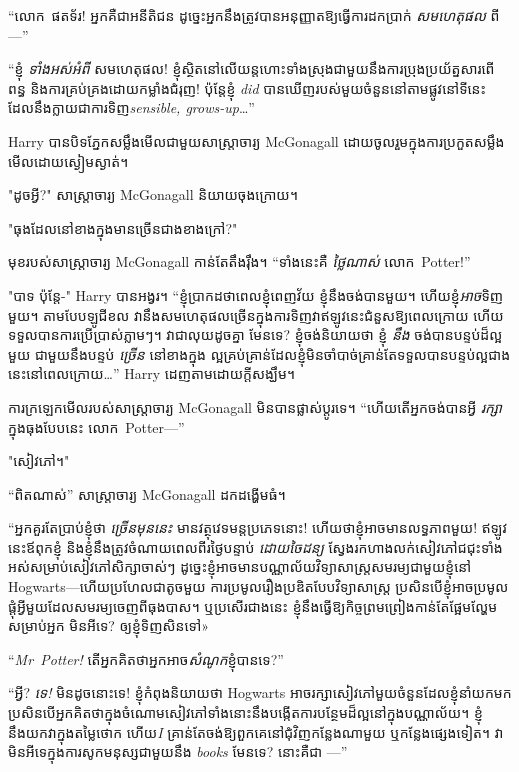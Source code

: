 “លោក~ផតទ័រ! អ្នកគឺជាអនីតិជន ដូច្នេះអ្នកនឹងត្រូវបានអនុញ្ញាតឱ្យធ្វើការដកប្រាក់ \emph{សមហេតុផល} ពី—”

“ខ្ញុំ \emph{ទាំងអស់អំពី} សមហេតុផល! ខ្ញុំ​ស្ថិត​នៅ​លើ​យន្តហោះ​ទាំង​ស្រុង​ជាមួយ​នឹង​ការ​ប្រុង​ប្រយ័ត្ន​សារពើពន្ធ និង​ការ​គ្រប់​គ្រង​ដោយ​កម្លាំង​ជំរុញ! ប៉ុន្តែខ្ញុំ \emph{did} បានឃើញរបស់មួយចំនួននៅតាមផ្លូវនៅទីនេះ ដែលនឹងក្លាយជាការទិញ\emph{sensible, grows-up}…”

Harry បានបិទភ្នែកសម្លឹងមើលជាមួយសាស្រ្តាចារ្យ McGonagall ដោយចូលរួមក្នុងការប្រកួតសម្លឹងមើលដោយស្ងៀមស្ងាត់។

"ដូចអ្វី?" សាស្ត្រាចារ្យ McGonagall និយាយចុងក្រោយ។

"ធុងដែលនៅខាងក្នុងមានច្រើនជាងខាងក្រៅ?"

មុខរបស់សាស្រ្តាចារ្យ McGonagall កាន់តែតឹងរ៉ឹង។ “ទាំងនេះគឺ \emph{ ថ្លៃណាស់} លោក~Potter!”

"បាទ ប៉ុន្តែ-" Harry បានអង្វរ។ “ខ្ញុំ​ប្រាកដ​ថា​ពេល​ខ្ញុំ​ពេញ​វ័យ ខ្ញុំ​នឹង​ចង់​បាន​មួយ។ ហើយខ្ញុំ\emph{អាច}ទិញមួយ។ តាមបែបឡូជីខល វានឹងសមហេតុផលច្រើនក្នុងការទិញវាឥឡូវនេះជំនួសឱ្យពេលក្រោយ ហើយទទួលបានការប្រើប្រាស់ភ្លាមៗ។ វាជាលុយដូចគ្នា មែនទេ? ខ្ញុំចង់និយាយថា ខ្ញុំ \emph{នឹង} ចង់បានបន្ទប់ដ៏ល្អមួយ ជាមួយនឹងបន្ទប់ \emph{ច្រើន} នៅខាងក្នុង ល្អគ្រប់គ្រាន់ដែលខ្ញុំមិនចាំបាច់គ្រាន់តែទទួលបានបន្ទប់ល្អជាងនេះនៅពេលក្រោយ…” Harry ដេញតាមដោយក្តីសង្ឃឹម។

ការក្រឡេកមើលរបស់សាស្រ្តាចារ្យ McGonagall មិនបានផ្លាស់ប្តូរទេ។ “ហើយតើអ្នកចង់បានអ្វី \emph{រក្សា} ក្នុងធុងបែបនេះ លោក~Potter—”

"សៀវភៅ។"

“ពិតណាស់” សាស្ត្រាចារ្យ McGonagall ដកដង្ហើមធំ។

“អ្នក​គួរ​តែ​ប្រាប់​ខ្ញុំ​ថា \emph{ច្រើន​មុន​នេះ} មាន​វត្ថុ​វេទមន្ត​ប្រភេទ​នោះ! ហើយថាខ្ញុំអាចមានលទ្ធភាពមួយ! ឥឡូវនេះឪពុកខ្ញុំ និងខ្ញុំនឹងត្រូវចំណាយពេលពីរថ្ងៃបន្ទាប់ \emph{ដោយចៃដន្យ} ស្វែងរកហាងលក់សៀវភៅជជុះទាំងអស់សម្រាប់សៀវភៅសិក្សាចាស់ៗ ដូច្នេះខ្ញុំអាចមានបណ្ណាល័យវិទ្យាសាស្ត្រសមរម្យជាមួយខ្ញុំនៅ Hogwarts—ហើយប្រហែលជាតូចមួយ ការប្រមូលរឿងប្រឌិតបែបវិទ្យាសាស្ត្រ ប្រសិនបើខ្ញុំអាចប្រមូលផ្តុំអ្វីមួយដែលសមរម្យចេញពីធុងបាស។ ឬប្រសើរជាងនេះ ខ្ញុំនឹងធ្វើឱ្យកិច្ចព្រមព្រៀងកាន់តែផ្អែមល្ហែមសម្រាប់អ្នក មិនអីទេ? ឲ្យ​ខ្ញុំ​ទិញ​សិន​ទៅ»

“\emph{Mr~Potter!} តើអ្នកគិតថាអ្នកអាច\emph{សំណូក}ខ្ញុំបានទេ?”

“អ្វី? \emph{ទេ!} មិនដូចនោះទេ! ខ្ញុំកំពុងនិយាយថា Hogwarts អាចរក្សាសៀវភៅមួយចំនួនដែលខ្ញុំនាំយកមក ប្រសិនបើអ្នកគិតថាក្នុងចំណោមសៀវភៅទាំងនោះនឹងបង្កើតការបន្ថែមដ៏ល្អនៅក្នុងបណ្ណាល័យ។ ខ្ញុំនឹងយកវាក្នុងតម្លៃថោក ហើយ\emph{I} គ្រាន់តែចង់ឱ្យពួកគេនៅជុំវិញកន្លែងណាមួយ ឬកន្លែងផ្សេងទៀត។ វាមិនអីទេក្នុងការសូកមនុស្សជាមួយនឹង \emph{books} មែនទេ? នោះ​គឺ​ជា —”

